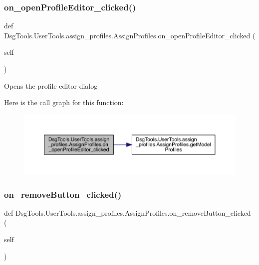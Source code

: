 \subsubsection{\texorpdfstring{on\+\_\+open\+Profile\+Editor\+\_\+clicked()}{on\_openProfileEditor\_clicked()}}
{\footnotesize\ttfamily def Dsg\+Tools.\+User\+Tools.\+assign\+\_\+profiles.\+Assign\+Profiles.\+on\+\_\+open\+Profile\+Editor\+\_\+clicked (\begin{DoxyParamCaption}\item[{}]{self }\end{DoxyParamCaption})}

\begin{DoxyVerb}Opens the profile editor dialog
\end{DoxyVerb}
 Here is the call graph for this function\+:
\nopagebreak
\begin{figure}[H]
\begin{center}
\leavevmode
\includegraphics[width=350pt]{class_dsg_tools_1_1_user_tools_1_1assign__profiles_1_1_assign_profiles_a9a407f938b7498037bec6fd0e58cfeaf_cgraph}
\end{center}
\end{figure}
\mbox{\label{class_dsg_tools_1_1_user_tools_1_1assign__profiles_1_1_assign_profiles_a0b757b8d4a1278a01c6dd48034a194c6}} 
\subsubsection{\texorpdfstring{on\+\_\+remove\+Button\+\_\+clicked()}{on\_removeButton\_clicked()}}
{\footnotesize\ttfamily def Dsg\+Tools.\+User\+Tools.\+assign\+\_\+profiles.\+Assign\+Profiles.\+on\+\_\+remove\+Button\+\_\+clicked (\begin{DoxyParamCaption}\item[{}]{self }\end{DoxyParamCaption})}

